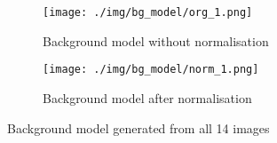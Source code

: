 \documentclass[main.tex]{subfiles}
\begin{document}
\begin{figure}[!h]
  \centering
  \begin{subfigure}[b]{.45\textwidth}
    \centering
    \texttt{[image: ./img/bg\_model/org\_1.png]}
    \caption{Background model without normalisation}
  \end{subfigure}
  \begin{subfigure}[b]{.45\textwidth}
    \centering
    \texttt{[image: ./img/bg\_model/norm\_1.png]}
    \caption{Background model after normalisation}
  \end{subfigure}
  \caption{Background model generated from all 14 images}
  \label{bg_model}
\end{figure}


%
%
\end{document}
